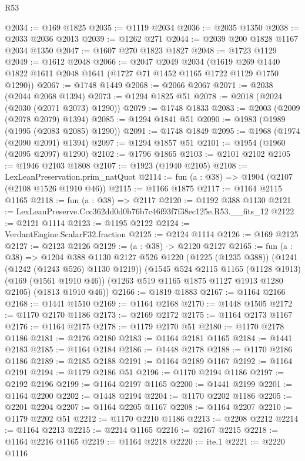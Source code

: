 \begin{lexlean}{R53}
\begin{coremodule}
@2034 := @169 @1825
@2035 := @1119 @2034
@2036 := @2035 @1350
@2038 := @2033 @2036 @2013
@2039 := @1262 @271
@2044 := @2039 @200 @1828 @1167 @2034 @1350
@2047 := @1607 @270 @1823 @1827
@2048 := @1723 @1129
@2049 := @1612 @2048
@2066 := @2047
    @2049
    @2034
    (@1619 @269 @1440 @1822 @1611 @2048 @1641 (@1727 @71 @1452 @1165 @1722 @1129 @1750 @1290))
@2067 := @1748 @1449
@2068 := @2066 @2067
@2071 := @2038 (@2044 @2068 @1394)
@2073 := @1294 @1825 @51
@2078 := @2018 (@2024 (@2030 (@2071 @2073) @1290))
@2079 := @1748 @1833
@2083 := @2003 (@2009 (@2078 @2079) @1394)
@2085 := @1294 @1841 @51
@2090 := @1983 (@1989 (@1995 (@2083 @2085) @1290))
@2091 := @1748 @1849
@2095 := @1968 (@1974 (@2090 @2091) @1394)
@2097 := @1294 @1857 @51
@2101 := @1954 (@1960 (@2095 @2097) @1290)
@2102 := @1796 @1865
@2103 := @2101 @2102
@2105 := @1946 @2103 @1808
@2107 := @1923 (@1940 @2105)
@2108 := LexLeanPreservation.prim_natQuot
@2114 := fun (a : @38) => @1904 (@2107 (@2108 @1526 @1910 @46))
@2115 := @1166 @1875
@2117 := @1164 @2115 @1165
@2118 := fun (a : @38) => @2117
@2120 := @1192 @388 @1130
@2121 := LexLeanPreserve.Ccc362dd0d0b76b7c46f93f7f38ec125e.R53.__fits_12
@2122 := @2121 @1114
@2123 := @1195 @2122
@2124 := VerdantEngine.ScalarF32.fraction
@2125 := @2124 @1114
@2126 := @169 @2125
@2127 := @2123 @2126
@2129 := (a : @38) -> @2120 @2127
@2165 := fun (a : @38) =>
  @1204
    @388
    @1130
    @2127
    @526
    @1220
    (@1225 (@1235 @388))
    (@1241 (@1242 (@1243 @526) @1130 @1219))
    (@1545
      @524
      @2115
      @1165
      (@1128 @1913)
      (@169 (@1561 @1910 @46))
      (@1263 @519 @1165 @1875 @1127 @1913 @1280 @2105)
      (@1813 @1910 @46))
@2166 := @1819 @1883
@2167 := @1164 @2166
@2168 := @1441 @1510
@2169 := @1164 @2168
@2170 := @1448 @1505
@2172 := @1170 @2170 @1186
@2173 := @2169 @2172
@2175 := @1164 @2173 @1167
@2176 := @1164 @2175
@2178 := @1179 @2170 @51
@2180 := @1170 @2178 @1186
@2181 := @2176 @2180
@2183 := @1164 @2181 @1165
@2184 := @1441 @2183
@2185 := @1164 @2184
@2186 := @1448 @2178
@2188 := @1170 @2186 @1186
@2189 := @2185 @2188
@2191 := @1164 @2189 @1167
@2192 := @1164 @2191
@2194 := @1179 @2186 @51
@2196 := @1170 @2194 @1186
@2197 := @2192 @2196
@2199 := @1164 @2197 @1165
@2200 := @1441 @2199
@2201 := @1164 @2200
@2202 := @1448 @2194
@2204 := @1170 @2202 @1186
@2205 := @2201 @2204
@2207 := @1164 @2205 @1167
@2208 := @1164 @2207
@2210 := @1179 @2202 @51
@2212 := @1170 @2210 @1186
@2213 := @2208 @2212
@2214 := @1164 @2213
@2215 := @2214 @1165
@2216 := @2167 @2215
@2218 := @1164 @2216 @1165
@2219 := @1164 @2218
@2220 := ite.{1}
@2221 := @2220 @1116

\end{coremodule}
\end{lexlean}
